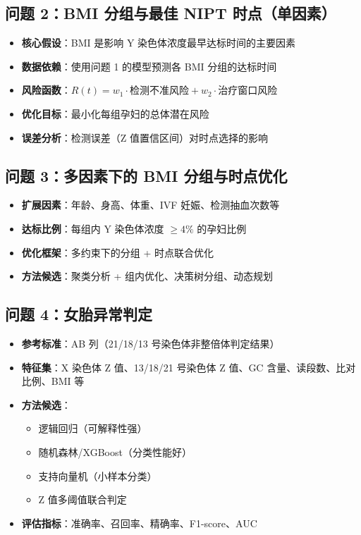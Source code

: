 \documentclass{internal-report}
\begin{document}
\subsection{问题 2：BMI 分组与最佳 NIPT 时点（单因素）}

\begin{itemize}
  \item \textbf{核心假设}：BMI 是影响 Y 染色体浓度最早达标时间的主要因素
  \item \textbf{数据依赖}：使用问题 1 的模型预测各 BMI 分组的达标时间
  \item \textbf{风险函数}：$R(t) = w_1 \cdot \text{检测不准风险} + w_2 \cdot \text{治疗窗口风险}$
  \item \textbf{优化目标}：最小化每组孕妇的总体潜在风险
  \item \textbf{误差分析}：检测误差（Z 值置信区间）对时点选择的影响
\end{itemize}

\subsection{问题 3：多因素下的 BMI 分组与时点优化}

\begin{itemize}
  \item \textbf{扩展因素}：年龄、身高、体重、IVF 妊娠、检测抽血次数等
  \item \textbf{达标比例}：每组内 Y 染色体浓度 $\geq 4\%$ 的孕妇比例
  \item \textbf{优化框架}：多约束下的分组 + 时点联合优化
  \item \textbf{方法候选}：聚类分析 + 组内优化、决策树分组、动态规划
\end{itemize}

\subsection{问题 4：女胎异常判定}

\begin{itemize}
  \item \textbf{参考标准}：AB 列（21/18/13 号染色体非整倍体判定结果）
  \item \textbf{特征集}：X 染色体 Z 值、13/18/21 号染色体 Z 值、GC 含量、读段数、比对比例、BMI 等
  \item \textbf{方法候选}：
    \begin{itemize}
      \item 逻辑回归（可解释性强）
      \item 随机森林/XGBoost（分类性能好）
      \item 支持向量机（小样本分类）
      \item Z 值多阈值联合判定
    \end{itemize}
  \item \textbf{评估指标}：准确率、召回率、精确率、F1-score、AUC
\end{itemize}
\end{document}
